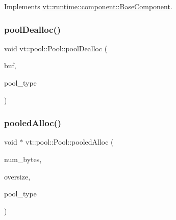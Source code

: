 Implements \hyperlink{structvt_1_1runtime_1_1component_1_1_base_component_a7701485f3539f78d42e6bad47fc7eb78}{vt\+::runtime\+::component\+::\+Base\+Component}.

\mbox{\label{structvt_1_1pool_1_1_pool_aa9ae08727c21035461d6f60b93ea19ab}} 
\subsubsection{\texorpdfstring{pool\+Dealloc()}{poolDealloc()}}
{\footnotesize\ttfamily void vt\+::pool\+::\+Pool\+::pool\+Dealloc (\begin{DoxyParamCaption}\item[{void $\ast$const}]{buf,  }\item[{\hyperlink{structvt_1_1pool_1_1_pool_ace8d36439e5e599a8ee68b2f1a6a6b28}{e\+Pool\+Size} const}]{pool\+\_\+type }\end{DoxyParamCaption})\hspace{0.3cm}{\ttfamily [private]}}

\mbox{\label{structvt_1_1pool_1_1_pool_a8a6ff684a26b2229cbf263e99a1bc2ee}} 
\subsubsection{\texorpdfstring{pooled\+Alloc()}{pooledAlloc()}}
{\footnotesize\ttfamily void $\ast$ vt\+::pool\+::\+Pool\+::pooled\+Alloc (\begin{DoxyParamCaption}\item[{size\+\_\+t const \&}]{num\+\_\+bytes,  }\item[{size\+\_\+t const \&}]{oversize,  }\item[{\hyperlink{structvt_1_1pool_1_1_pool_ace8d36439e5e599a8ee68b2f1a6a6b28}{e\+Pool\+Size} const}]{pool\+\_\+type }\end{DoxyParamCaption})\hspace{0.3cm}{\ttfamily [private]}}

\mbox{\label{structvt_1_1pool_1_1_pool_a7d6742d6abc615255e25363a1be067be}} 
